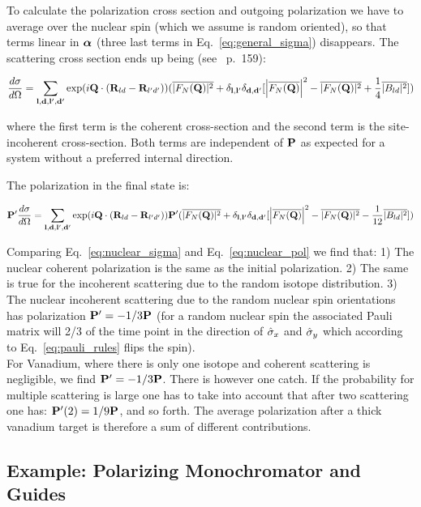 To calculate the polarization cross section and outgoing polarization
we have to average over the nuclear spin (which we assume is random
oriented), so that terms linear in $\boldsymbol{\alpha}$ (three last terms in
Eq.~\ref{eq:general_sigma}) disappears. The scattering cross section
ends up being (see~\cite{lovesey84} p.~159):

\begin{equation}
  \label{eq:nuclear_sigma}
  \frac{d\sigma}{d\Omega}  =
  \sum_{\mathbf{l}, \mathbf{d}, \mathbf{l}', \mathbf{d}'} \exp(i \mathbf{Q} \cdot (\mathbf{R}_{ld}-\mathbf{R}_{l'd'}))
  (\overline{|F_N(\mathbf{Q})|^2} + \delta_{\mathbf{l},\mathbf{l}'}\delta_{\mathbf{d},\mathbf{d}'}[\left|\overline{F_N(\mathbf{Q})}\right|^2 - \overline{|F_N(\mathbf{Q})|^2}
  + \frac{1}{4}\overline{|B_{ld}|^2}])
\end{equation}

where the first term is the coherent cross-section and the second term is the
site-incoherent cross-section. Both terms are independent of $\mathbf{P}$ as expected
for a system without a preferred internal direction.

The polarization in the final state is:

\begin{equation}
  \label{eq:nuclear_pol}
  \mathbf{P}' \frac{d\sigma}{d\Omega}  =
  \sum_{\mathbf{l}, \mathbf{d}, \mathbf{l}', \mathbf{d}'} \exp(i \mathbf{Q} \cdot (\mathbf{R}_{ld}-\mathbf{R}_{l'd'}))
  \mathbf{P}' (\overline{|F_N(\mathbf{Q})|^2} + \delta_{\mathbf{l},\mathbf{l}'}\delta_{\mathbf{d},\mathbf{d}'}[\left|\overline{F_N(\mathbf{Q})}\right|^2 - \overline{|F_N(\mathbf{Q})|^2}
  - \frac{1}{12}\overline{|B_{ld}|^2}])
\end{equation}

Comparing Eq.~\ref{eq:nuclear_sigma} and Eq.~\ref{eq:nuclear_pol} we
find that: 1) The nuclear coherent polarization is the same as the
initial polarization. 2) The same is true for the incoherent
scattering due to the random isotope distribution. 3) The nuclear
incoherent scattering due to the random nuclear spin orientations has
polarization $\mathbf{P}' = -1/3 \mathbf{P}$ (for a random nuclear spin the
associated Pauli matrix will 2/3 of the time point in the direction of
$\hat\sigma_x$ and $\hat\sigma_y$ which according to
Eq.~\ref{eq:pauli_rules} flips the spin). \\

For Vanadium, where there is only one isotope and coherent scattering
is negligible, we find $\mathbf{P}' = -1/3\mathbf{P}$. There is however one
catch. If the probability for multiple scattering is large one has to
take into account that after two scattering one has: $\mathbf{P}'(2) =
1/9\mathbf{P}$, and so forth. The average polarization after a thick vanadium
target is therefore a sum of different contributions.

\subsection{Example: Polarizing Monochromator and Guides}
\label{sub:mono}


